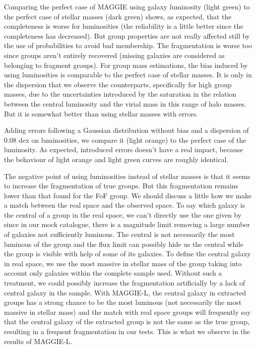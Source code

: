 Comparing the perfect case of MAGGIE using galaxy luminosity (light green) to
the perfect case of stellar masses (dark green) shows, as expected, that the
completeness is worse for luminosities (the reliability is a little better
since the completeness has decreased). But group properties are not really
affected still by the use of probabilities to avoid bad membership. The
fragmentation is worse too since groups aren't entirely recovered (missing
galaxies are considered as belonging to fragment groups). For group mass
estimations, the bias induced by using luminosities is comparable to the
perfect case of stellar masses. It is only in the dispersion that we observe
the counterparts, specifically for high group masses, due to the uncertainties
introduced by the saturation in the relation between the central luminosity and
the virial mass in this range of halo masses. But it is somewhat better
than using stellar masses with errors.

Adding errors following a Gaussian distribution without bias and a dispersion
of 0.08 dex on luminosities, we compare it (light orange) to the perfect case
of the luminosity. As expected, introduced errors doesn't have a real impact,
because the behaviour of light orange and light green curves are roughly
identical.

The negative point of using luminosities instead of stellar masses is that it
seems to increase the fragmentation of true groups. But this fragmentation
remains lower than that found for the FoF group. We should discuss a little how
we make a match between the real space and the observed space. To say which
galaxy is the central of a group in the real space, we can't directly use the
one given by~\cite{Guo+11} since in our mock catalogue, there is a magnitude
limit removing a large number of galaxies not sufficiently luminous. The
central is not necessarily the most luminous of the group and the flux limit
can possibly hide us the central while the group is visible with help of some
of its galaxies. To define the central galaxy in real space, we use the most
massive in stellar mass of the group taking into account only galaxies within
the complete sample used. Without such a treatment, we could possibly increase
the fragmentation artificially by a lack of central galaxy in the sample. With
MAGGIE-L, the central galaxy in extracted groups has a strong chance to be the
most luminous (not necessarily the most massive in stellar mass) and the match
with real space groups will frequently say that the central galaxy of the
extracted group is not the same as the true group, resulting in a frequent
fragmentation in our tests. This is what we observe in the results of MAGGIE-L.

